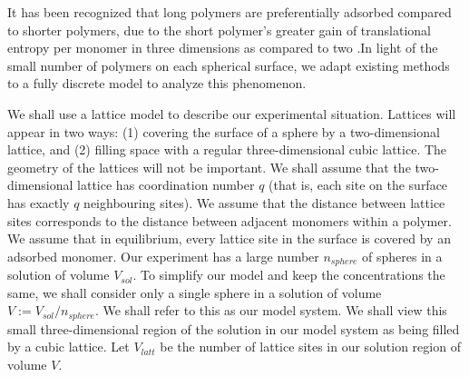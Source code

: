 \documentclass[journal=mamobx,manuscript=article]{achemso}
\begin{document}
It has been recognized that long polymers are
preferentially adsorbed compared to shorter polymers,
due to the short polymer's greater gain of
translational entropy per monomer in three dimensions
as compared to two 
\cite{Fleer1993}.In light of the small number of polymers on each
spherical surface, we adapt existing methods to a
fully discrete model to analyze this phenomenon.

We shall use a lattice model to describe our experimental situation.  
Lattices will appear in two ways:  (1) covering the surface of a sphere by a two-dimensional lattice, and
(2) filling space with a regular three-dimensional cubic lattice.  
The geometry of the lattices will not be important.  
We shall assume that the two-dimensional lattice has coordination number $q$ 
(that is, each site on the surface has exactly $q$ neighbouring sites).  We assume that 
the distance between lattice sites corresponds to the distance between adjacent monomers within a 
polymer.  We assume that in equilibrium, every lattice site in the surface is covered by an adsorbed 
monomer.
Our experiment has a large number $n_{sphere}$ of spheres in a solution of volume $V_{sol}$.  To simplify 
our model and keep the concentrations the same, we shall consider only a single sphere in a solution
of volume $V:=V_{sol}/n_{sphere}$.  We shall refer to this as our model system.
We shall view this small three-dimensional region of the solution in our model system as being filled by a 
cubic lattice.
Let $V_{latt}$ be the number of lattice sites in our solution region of volume $V$.




\end{document}

